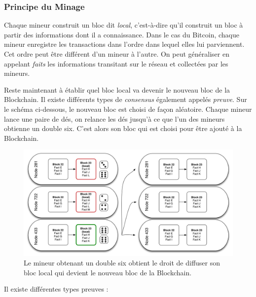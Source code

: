 \documentclass{article}
\begin{document}
\subsubsection{Principe du Minage}

Chaque mineur construit un bloc dit \textit{local}, c'est-à-dire qu'il construit un bloc à partir des informations dont il a connaissance. Dans le cas du Bitcoin, chaque mineur enregistre les transactions dans l'ordre dans lequel elles lui parviennent. Cet ordre peut être différent d'un mineur à l'autre. On peut généraliser en appelant \textit{faits} les informations transitant sur le réseau et collectées par les mineurs.

Reste maintenant à établir quel bloc local va devenir le nouveau bloc de la Blockchain. Il existe différents types de \textit{consensus} également appelés \textit{preuve}. Sur le schéma ci-dessous, le nouveau bloc est choisi de façon aléatoire. Chaque mineur lance une paire de dés, on relance les dés jusqu'à ce que l'un des mineurs obtienne un double six. C'est alors son bloc qui est choisi pour être ajouté à la Blockchain.

\begin{figure}[!h]
    \centering
    \includegraphics[scale=0.46]{rolling_dice.png}
    \caption{Le mineur obtenant un double six obtient le droit de diffuser son bloc local qui devient le nouveau bloc de la Blockchain.}
    \vspace{-10pt}
    \label{fig:my_label}
\end{figure}

Il existe différentes types preuves : 
\end{document}
